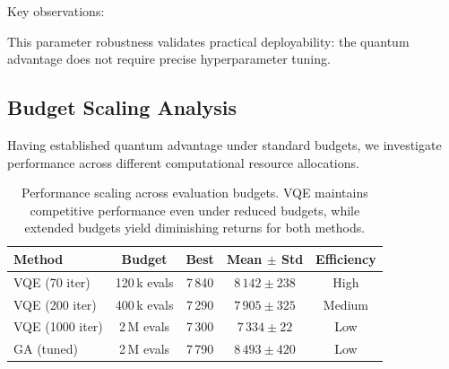 Key observations:

This parameter robustness validates practical deployability: the quantum advantage does not require precise hyperparameter tuning.

\subsection{Budget Scaling Analysis}

Having established quantum advantage under standard budgets, we investigate performance across different computational resource allocations.


\begin{table}[htb]
    \centering
    \caption{Performance scaling across evaluation budgets. VQE maintains competitive performance even under reduced budgets, while extended budgets yield diminishing returns for both methods.}
    \label{tab:budget_scaling}
    \begin{tabular}{lcccc}
        \toprule
        Method & Budget & Best & Mean $\pm$ Std & Efficiency \\
        \midrule
        VQE (70 iter) & 120\,k evals & 7\,840 & $8\,142 \pm 238$ & High \\
        VQE (200 iter) & 400\,k evals & 7\,290 & $7\,905 \pm 325$ & Medium \\
        VQE (1000 iter) & 2\,M evals & 7\,300 & $7\,334 \pm 22$ & Low \\
        GA (tuned) & 2\,M evals & 7\,790 & $8\,493 \pm 420$ & Low \\
        \bottomrule
    \end{tabular}
\end{table}

